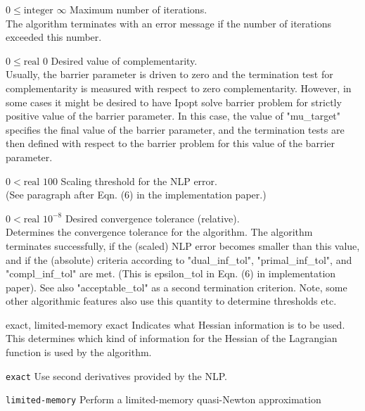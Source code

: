 %
{$0\leq\textrm{integer}$}%
{$\infty$}%
{Maximum number of iterations.\\
The algorithm terminates with an error message if the number of iterations exceeded this number.}%
{}

%
{$0\leq\textrm{real}$}%
{$0$}%
{Desired value of complementarity.\\
Usually, the barrier parameter is driven to zero and the termination test for complementarity is measured with respect to zero complementarity.  However, in some cases it might be desired to have Ipopt solve barrier problem for strictly positive value of the barrier parameter.  In this case, the value of "mu\_target" specifies the final value of the barrier parameter, and the termination tests are then defined with respect to the barrier problem for this value of the barrier parameter.}%
{}

%
{$0<\textrm{real}$}%
{$100$}%
{Scaling threshold for the NLP error.\\
(See paragraph after Eqn. (6) in the implementation paper.)}%
{}

%
{$0<\textrm{real}$}%
{$10^{- 8}$}%
{Desired convergence tolerance (relative).\\
Determines the convergence tolerance for the algorithm.  The algorithm terminates successfully, if the (scaled) NLP error becomes smaller than this value, and if the (absolute) criteria according to "dual\_inf\_tol", "primal\_inf\_tol", and "compl\_inf\_tol" are met.  (This is epsilon\_tol in Eqn. (6) in implementation paper).  See also "acceptable\_tol" as a second termination criterion.  Note, some other algorithmic features also use this quantity to determine thresholds etc.}%
{}

%
{\ttfamily exact, limited-memory}%
{exact}%
{Indicates what Hessian information is to be used.\\
This determines which kind of information for the Hessian of the Lagrangian function is used by the algorithm.}%
{\begin{list}{}{
\setlength{\parsep}{0em}
\setlength{\leftmargin}{5ex}
\setlength{\labelwidth}{2ex}
\setlength{\itemindent}{0ex}
\setlength{\topsep}{0pt}}
\item[\texttt{exact}] Use second derivatives provided by the NLP.
\item[\texttt{limited-memory}] Perform a limited-memory quasi-Newton approximation
\end{list}
}

